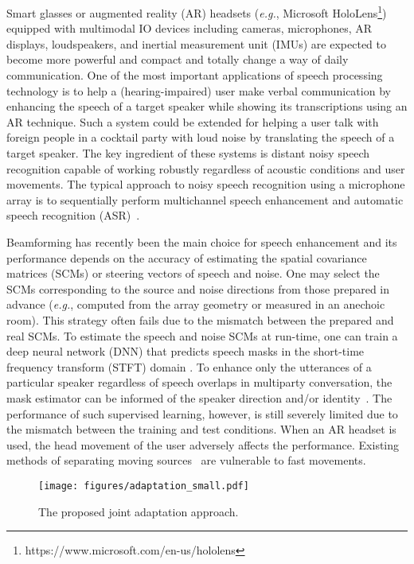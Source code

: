 \documentclass[a4paper]{article}
\newcommand{\eg}{\textit{e.g.}}
\begin{document}
Smart glasses or augmented reality (AR) headsets 
 (\eg, Microsoft HoloLens\footnote{https://www.microsoft.com/en-us/hololens})
 equipped with multimodal IO devices
 including cameras, microphones, AR displays, loudspeakers, 
 and inertial measurement unit (IMUs)
 are expected to become more powerful and compact
 and totally change a way of daily communication.
One of the most important applications of speech processing technology
 is to help a (hearing-impaired) user make verbal communication
 by enhancing the speech of a target speaker
 while showing its transcriptions using an AR technique.
Such a system could be extended
 for helping a user talk with foreign people in a cocktail party with loud noise
 by translating the speech of a target speaker.
The key ingredient of these systems
 is distant noisy speech recognition capable of working robustly
 regardless of acoustic conditions and user movements.
The typical approach to noisy speech recognition 
 using a microphone array is to sequentially perform 
 multichannel speech enhancement and automatic speech recognition (ASR)~\cite{heymann_neural_2016,erdogan_improved_2016}.

Beamforming has recently been the main choice for speech enhancement
 and its performance depends on the accuracy
 of estimating the spatial covariance matrices (SCMs) 
 or steering vectors of speech and noise.
One may select the SCMs corresponding to the source and noise directions
 from those prepared in advance
 (\eg, computed from the array geometry
 or measured in an anechoic room).
This strategy often fails
 due to the mismatch between the prepared and real SCMs.
To estimate the speech and noise SCMs at run-time,
 one can train a deep neural network (DNN)
 that predicts speech masks in the short-time frequency transform (STFT) domain
 \cite{heymann_neural_2016,erdogan_improved_2016}.
To enhance only the utterances of a particular speaker 
 regardless of speech overlaps in multiparty conversation,
 the mask estimator can be informed 
 of the speaker direction and/or identity~\cite{8639593,8268910, Nakagome2020, Subramanian2020,Li2019,li_icassp2022,shao_icassp2022,subramanian_icassp2021}.
The performance of such supervised learning, however, is still severely limited
 due to the mismatch between the training and test conditions.
When an AR headset is used,
 the head movement of the user adversely affects the performance.
Existing methods of separating moving sources~\cite{1200008,5496044,8114273}
 are vulnerable to fast movements.

\begin{figure}[t]
  \centering
  \texttt{[image: figures/adaptation\_small.pdf]}
  \vspace{-1mm}
  \caption{The proposed joint adaptation approach.}
  \vspace{-2.5mm}
  \label{fig:domain_adaptation}
\end{figure}
\end{document}
